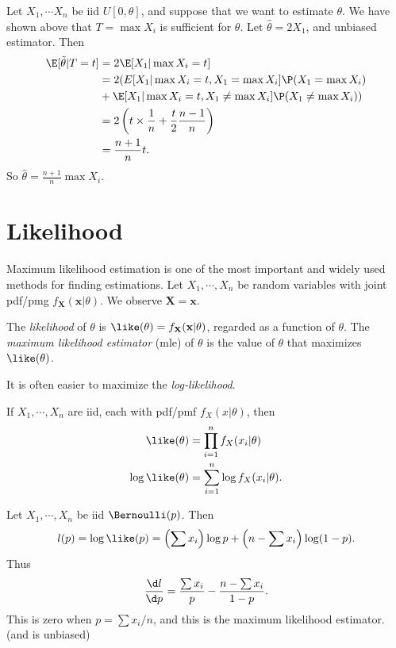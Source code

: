 \documentclass[a4paper]{article}
\begin{document}
\begin{eg}
  Let $X_1, \cdots X_n$ be iid $U[0, \theta]$, and suppose that we want to estimate $\theta$. We have shown above that $T = \max X_i$ is sufficient for $\theta$. Let $\hat{\theta} = 2X_1$, and unbiased estimator. Then
  \begin{align*}
    \E[\tilde{\theta}|T = t] &= 2\E[X_1|\max X_i = t]\\
    &= 2(E[X_1|\max X_i = t, X_1 = \max X_i]\P(X_1 = \max X_i)\\
    &+ \E[X_1|\max X_i = t, X_1 \not= \max X_i] \P(X_1 \not= \max X_i))\\
    &= 2\left(t\times \frac{1}{n} + \frac{t}{2}\frac{n - 1}{n}\right)\\
    &= \frac{n + 1}{n}t.
  \end{align*}
  So $\hat{\theta} = \frac{n + 1}{n}\max X_i$.
\end{eg}

\section{Likelihood}
Maximum likelihood estimation is one of the most important and widely used methods for finding estimations. Let $X_1, \cdots , X_n$ be random variables with joint pdf/pmg $f_\mathbf{X}(\mathbf{x}|\theta)$. We observe $\mathbf{X} = \mathbf{x}$.

\begin{defi}[Likelihood]
  The \emph{likelihood} of $\theta$ is $\like(\theta) = f_\mathbf{X}(\mathbf{x} | \theta)$, regarded as a function of $\theta$. The \emph{maximum likelihood estimator} (mle) of $\theta$ is the value of $\theta$ that maximizes $\like (\theta)$.
\end{defi}
It is often easier to maximize the \emph{log-likelihood}.

If $X_1, \cdots, X_n$ are iid, each with pdf/pmf $f_X(x|\theta)$, then
\begin{align*}
  \like(\theta) &= \prod_{i = 1}^n f_X(x_i|\theta)\\
  \log\like (\theta) &= \sum_{i = 1}^n \log f_X(x_i|\theta).
\end{align*}

\begin{eg}
  Let $X_1, \cdots, X_n$ be iid $\Bernoulli(p)$. Then
  \[
    l(p) =\log\like(p) = \left(\sum x_i\right)\log p + \left(n - \sum x_i\right)\log(1 - p).
  \]
  Thus
  \[
    \frac{\d l}{\d p} = \frac{\sum x_i}{p} - \frac{n - \sum x_i}{1 - p}.
  \]
  This is zero when $p = \sum x_i /n$, and this is the maximum likelihood estimator. (and is unbiased)
\end{eg}
\end{document}

